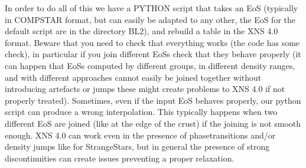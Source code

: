 \documentclass[letterpaper,10pt,english]{sphinxmanual}
\begin{document}
\sphinxAtStartPar
In order to do all of this we have a PYTHON script that takes an EoS (typically in COMPSTAR format, but can easily be adapted to any other, the EoS for the default script are in the directory BL2), and rebuild a table in the XNS 4.0 format. Beware that you need to check that everything works (the code has some check), in particular if you join different EoSs check that they behave properly (it can happen that EoSs computed by different groups, in different density ranges, and with different approaches cannot easily be joined together without introducing artefacts or jumps \sphinxhyphen{} these might create problems to XNS 4.0 if not properly treated). Sometimes, even if the input EoS behaves properly, our python script can produce a wrong interpolation. This typically happens when two different EoS are joined (like at the edge of the crust) if the joining is not smooth enough. XNS 4.0 can work even in the presence of phase\sphinxhyphen{}transitions and/or density jumps like for Strange\sphinxhyphen{}Stars, but in general the presence of strong discontinuities can create issues preventing a proper relaxation.
\end{document}
